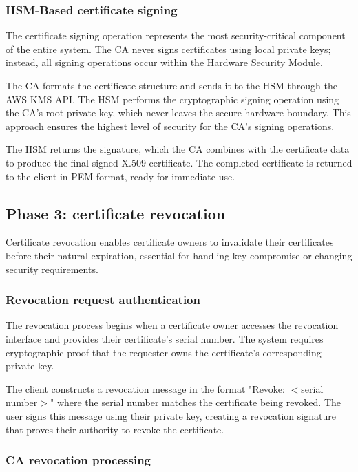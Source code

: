 \subsubsection{HSM-Based certificate signing}

The certificate signing operation represents the most security-critical component 
of the entire system. The CA never signs certificates using local private keys; 
instead, all signing operations occur within the Hardware Security Module.

The CA formats the certificate structure and sends it to the HSM through the 
AWS KMS API. The HSM performs the cryptographic signing operation using the 
CA's root private key, which never leaves the secure hardware boundary. This 
approach ensures the highest level of security for the CA's signing operations.

The HSM returns the signature, which the CA combines with the certificate data 
to produce the final signed X.509 certificate. The completed certificate is 
returned to the client in PEM format, ready for immediate use.

\subsection{Phase 3: certificate revocation}

Certificate revocation enables certificate owners to invalidate their certificates 
before their natural expiration, essential for handling key compromise or 
changing security requirements.

\subsubsection{Revocation request authentication}

The revocation process begins when a certificate owner accesses the revocation 
interface and provides their certificate's serial number. The system requires 
cryptographic proof that the requester owns the certificate's corresponding 
private key.

The client constructs a revocation message in the format "Revoke: $<$serial number$>$" 
where the serial number matches the certificate being revoked. The user signs 
this message using their private key, creating a revocation signature that 
proves their authority to revoke the certificate.

\subsubsection{CA revocation processing}

